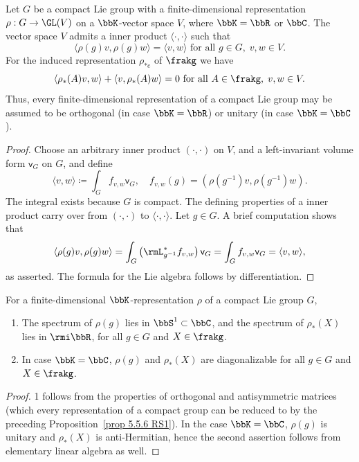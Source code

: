 \begin{prop}\label{prop 5.5.6 RS1}
    Let $G$ be a compact Lie group with a finite-dimensional representation $\rho:G\to \GL(V)$ on a $\bbK$-vector space $V$, where $\bbK=\bbR$ or $\bbC$. The vector space $V$ admits a inner product $\langle\cdot,\cdot\rangle$ such that
    \[\langle\rho(g)v,\rho(g)w\rangle=\langle v,w\rangle\text{ for all }g\in G,\; v,w\in V.\]
    For the induced representation $\rho_{\ast e}$ of $\frakg$ we have
    \[\langle \rho_{\ast}(A)v,w\rangle+\langle v,\rho_\ast (A) w\rangle=0\text{ for all }A\in\frakg,\;v,w\in V.\]
    Thus, every finite-dimensional representation of a compact Lie group may be assumed to be orthogonal (in case $\bbK=\bbR$) or unitary (in case $\bbK=\bbC$).
\end{prop}
\begin{proof}
    Choose an arbitrary inner product $(\cdot,\cdot)$ on $V$, and a left-invariant volume form $\mathsf{v}_G$ on $G$, and define
    \[ \langle v,w\rangle \coloneqq\int_G f_{v,w}\mathsf{v}_G, \quad f_{v,w}(g)=\left(\rho(g^{-1})v,\rho(g^{-1})w\right).\]
    The integral exists because $G$ is compact. The defining properties of a inner product carry over from $(\cdot,\cdot)$ to $\langle\cdot,\cdot\rangle$. Let $g\in G$. A brief computation shows that 
    \[\langle\rho(g)v,\rho(g)w\rangle=\int_G \left(\rmL_{g^{-1}}^\ast f_{v,w}\right)\mathsf{v}_G =\int_G f_{v,w}\mathsf{v}_G=\langle v,w\rangle,\]
    as asserted. The formula for the Lie algebra follows by differentiation.
\end{proof}


\begin{cor}[{{\cite[Cor.~5.5.7]{RS1}}}]\label{cor 5.5.7 RS1}
    For a finite-dimensional $\bbK$-representation $\rho$ of a compact Lie group $G$,
    \begin{enumerate}
        \item The spectrum of $\rho(g)$ lies in $\bbS^1\subset \bbC$, and the spectrum of $\rho_\ast(X)$ lies in $\rmi \bbR$, for all $g\in G$ and $X\in\frakg$.
        \item In case $\bbK=\bbC$, $\rho(g)$ and $\rho_\ast(X)$ are diagonalizable for all $g\in G$ and $X\in \frakg$.
    \end{enumerate}
\end{cor}
\begin{proof}
    1 follows from the properties of orthogonal and antisymmetric matrices (which every representation of a compact group can be reduced to by the preceding Proposition~\ref{prop 5.5.6 RS1}). In the case $\bbK=\bbC$, $\rho(g)$ is unitary and $\rho_\ast(X)$ is anti-Hermitian, hence the second assertion follows from elementary linear algebra as well.
\end{proof}






